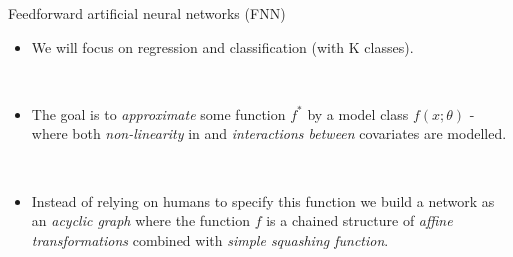 \documentclass[
  ignorenonframetext,
]{beamer}
\providecommand{\tightlist}{%
  \setlength{\itemsep}{0pt}\setlength{\parskip}{0pt}}
\begin{document}
\begin{frame}{Feedforward artificial neural networks (FNN)}
\protect\hypertarget{feedforward-artificial-neural-networks-fnn}{}
\begin{itemize}
\tightlist
\item
  We will focus on regression and classification (with K classes).
\end{itemize}

\(~\)

\begin{itemize}
\tightlist
\item
  The goal is to \emph{approximate} some function \(f^*\) by a model
  class \(f(x;\theta)\) - where both \emph{non-linearity} in and
  \emph{interactions between} covariates are modelled.
\end{itemize}

\(~\)

\begin{itemize}
\tightlist
\item
  Instead of relying on humans to specify this function we build a
  network as an \emph{acyclic graph} where the function \(f\) is a
  chained structure of \emph{affine transformations} combined with
  \emph{simple squashing function}.
\end{itemize}
\end{frame}
\end{document}
